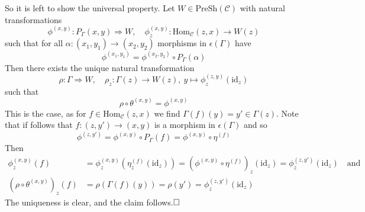 So it is left to show the universal property. Let $W \in \mathrm{PreSh}(\mathcal{C})$ with natural transformations
\begin{equation*}
    \phi^{(x, y)}: P_\Gamma(x, y) \Rightarrow W, \quad \phi^{(x, y)}_z: \mathrm{Hom}_{\mathcal{C}}(z, x) \to W(z)
\end{equation*}
such that for all $\alpha: (x_1, y_1) \to (x_2, y_2)$ morphisms in $\epsilon(\Gamma)$ have
\begin{equation*}
    \phi^{(x_1, y_1)} = \phi^{(x_2, y_2)} \circ P_\Gamma(\alpha)
\end{equation*}
Then there exists the unique natural transformation
\begin{equation*}
    \rho: \Gamma \Rightarrow W, \quad \rho_z: \Gamma(z) \to W(z), \ y \mapsto \phi^{(z, y)}_z(\mathrm{id}_z)
\end{equation*}
such that
\begin{equation*}
    \rho \circ \theta^{(x, y)} = \phi^{(x, y)}
\end{equation*}
This is the case, as for $f \in \mathrm{Hom}_{\mathcal{C}}(z, x)$ we find $\Gamma(f)(y) = y' \in \Gamma(z)$.
Note that if follows that $f: (z, y') \to (x, y)$ is a morphism in $\epsilon(\Gamma)$ and so
\begin{equation*}
    \phi^{(z, y')} = \phi^{(x, y)} \circ P_\Gamma(f) = \phi^{(x, y)} \circ \eta^{(f)}
\end{equation*}
Then
\begin{align*}
    \phi^{(x, y)}_z(f) &= \phi^{(x,y)}_z(\eta^{(f)}_z(\mathrm{id}_z)) = (\phi^{(x, y)} \circ \eta^{(f)})_z(\mathrm{id}_z) = \phi^{(z, y')}_z(\mathrm{id}_z) \quad \text{and} \\
    (\rho \circ \theta^{(x, y)})_z(f) &= \rho(\Gamma(f)(y)) = \rho(y') = \phi_z^{(z, y')}(\mathrm{id}_z)
\end{align*}
The uniqueness is clear, and the claim follows.$\hfill\square$